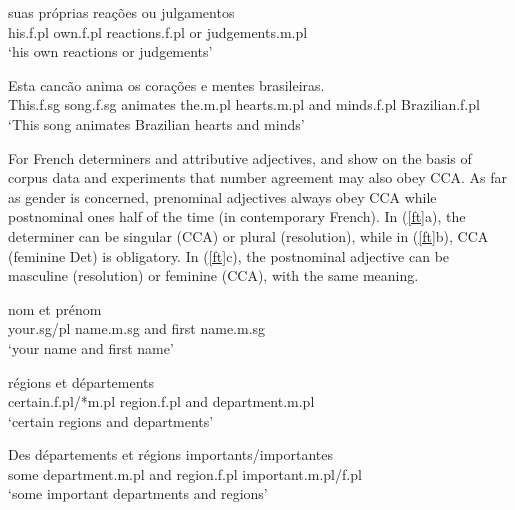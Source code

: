 \documentclass[output=paper
                ,modfonts
                ,nonflat
	        ,collection
	        ,collectionchapter
	        ,collectiontoclongg
 	        ,biblatex
                ,babelshorthands
                ,newtxmath
                ,draftmode
                ,colorlinks, citecolor=brown
]{./langsci/langscibook}
\begin{document}
\begin{exe}
 \ex
\begin{xlista}
\ex \gll suas pr\'{o}prias rea\c{c}\~{o}es ou julgamentos \\
his.{\sc f.pl} own.{\sc f.pl} reactions.{\sc f.pl} or judgements.{\sc m.pl} \\
\glt `his own reactions or judgements'\\ 
\citep[435]{Villavicencio:Sadler:ea:05}  


\ex \gll Esta canc\~{a}o anima os cora\c{c}\~{o}es e mentes brasileiras. \\
 This.{\sc f.sg}  song.{\sc f.sg} animates the.{\sc m.pl} hearts.{\sc m.pl} and minds.{\sc f.pl} Brazilian.{\sc f.pl} \\
\glt `This song animates Brazilian hearts and minds'\\
\citep[437]{Villavicencio:Sadler:ea:05} 
\end{xlista} \label{fo}
\end{exe}

For French determiners and attributive adjectives, \citet{An:Abeille:17} and \citet{Abeille:An:Shiraishi:18} show on the basis of corpus data and experiments that number agreement may also obey CCA. As far as gender is concerned, prenominal adjectives always obey CCA while postnominal ones half of the time (in contemporary French). In (\ref{ft}a), the determiner can be singular (CCA) or plural (resolution), while in (\ref{ft}b), CCA (feminine Det) is obligatory. In (\ref{ft}c), the postnominal adjective can be masculine (resolution) or feminine (CCA), with the same meaning.

\begin{exe}
 \ex
\begin{xlista}
\ex  {} nom et pr\'{e}nom \\
your.{sg/pl} name.{\sc m.sg} and first name.{\sc m.sg} \\
\glt `your name and first name'\\ 
\citep{An:Abeille:17}

\ex {} r\'{e}gions et d\'{e}partements \\
certain.{\sc f.pl}/*{\sc m.pl} region.{\sc f.pl} and department.{\sc m.pl} \\
\glt `certain regions and departments'\\ \citep{Abeille:An:Shiraishi:18}

\ex \gll Des d\'{e}partements et r\'{e}gions importants/importantes\\
some department.{\sc m.pl} and region.{\sc f.pl} important.{\sc m.pl}/{\sc f.pl}\\
\glt `some important departments and regions'
\end{xlista}\label{ft}
\end{exe}
\end{document}
